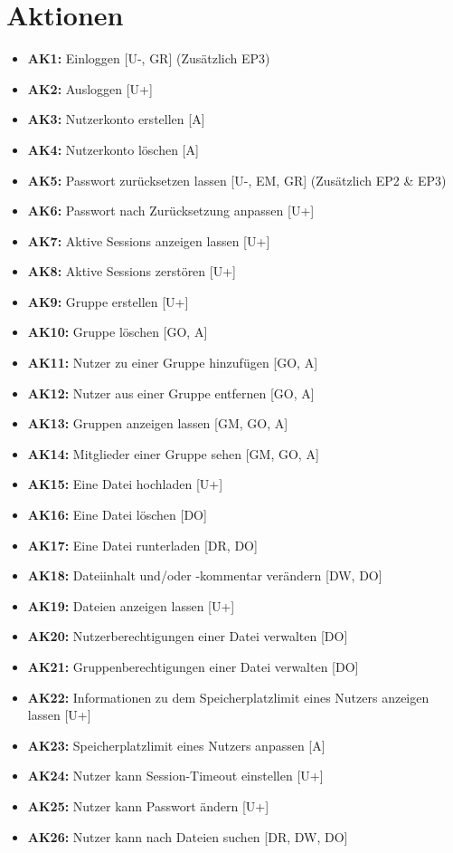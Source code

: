 \documentclass[fontsize=12pt,DIV=14,BCOR=10mm,a4paper,parskip=half-,headsepline,headinclude,english,ngerman,bibliography=totocnumbered]{scrreprt}
\begin{document}
\chapter{Aktionen}

\begin{itemize}
  \item \textbf{AK1:} Einloggen [U-, GR] (Zusätzlich EP3)
  \item \textbf{AK2:} Ausloggen [U+]

  \item \textbf{AK3:} Nutzerkonto erstellen [A]
  \item \textbf{AK4:} Nutzerkonto löschen [A]
  \item \textbf{AK5:} Passwort zurücksetzen lassen [U-, EM, GR] (Zusätzlich EP2 \& EP3)
  \item \textbf{AK6:} Passwort nach Zurücksetzung anpassen [U+]
  \item \textbf{AK7:} Aktive Sessions anzeigen lassen [U+]
  \item \textbf{AK8:} Aktive Sessions zerstören [U+]

  \item \textbf{AK9:} Gruppe erstellen [U+]
  \item \textbf{AK10:} Gruppe löschen [GO, A]
  \item \textbf{AK11:} Nutzer zu einer Gruppe hinzufügen [GO, A]
  \item \textbf{AK12:} Nutzer aus einer Gruppe entfernen [GO, A]
  \item \textbf{AK13:} Gruppen anzeigen lassen [GM, GO, A]
  \item \textbf{AK14:} Mitglieder einer Gruppe sehen [GM, GO, A]

  \item \textbf{AK15:} Eine Datei hochladen [U+]
  \item \textbf{AK16:} Eine Datei löschen [DO]
  \item \textbf{AK17:} Eine Datei runterladen [DR, DO]
  \item \textbf{AK18:} Dateiinhalt und/oder -kommentar verändern [DW, DO]
  \item \textbf{AK19:} Dateien anzeigen lassen [U+]
  \item \textbf{AK20:} Nutzerberechtigungen einer Datei verwalten [DO]
  \item \textbf{AK21:} Gruppenberechtigungen einer Datei verwalten [DO]
  \item \textbf{AK22:} Informationen zu dem Speicherplatzlimit eines Nutzers anzeigen lassen [U+]
  \item \textbf{AK23:} Speicherplatzlimit eines Nutzers anpassen [A]
  \item \textbf{AK24:} Nutzer kann Session-Timeout einstellen [U+]
  \item \textbf{AK25:} Nutzer kann Passwort ändern [U+]
  \item \textbf{AK26:} Nutzer kann nach Dateien suchen [DR, DW, DO]


\end{itemize}
\end{document}

